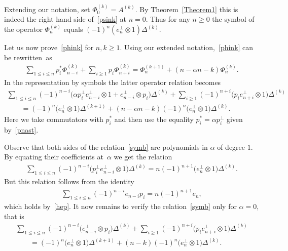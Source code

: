 Extending our notation, set $\Phi^{(k)}_0=A^{(k)}$.
By Theorem~\ref{Theorem1} this is indeed the right hand side of~\eqref{psink} at $n=0$.
Thus for any $n\ge0$ the symbol of the operator $\Phi^{(k)}_n$ equals $(-1)^{
n}(e_n^{\perp}\otimes1)\Delta^{(k)}$.

Let us now prove~\eqref{phink} for $n,k\ge1$.
Using our extended notation,~\eqref{phink} can be rewritten~as
\begin{gather*}
\sum_{1\le i\le n}p^{\ast}_i\Phi_{n-i}^{(k)}+\sum_{i\ge1}
p_i\Phi_{n+i}^{(k)}=\Phi^{(k+1)}_n+(
n-\alpha n-k)\Phi_n^{(k)}.
\end{gather*}
In the representation by symbols the latter operator relation becomes
\begin{gather}
\sum_{1\le i\le n}(-1)^{n-i}\big(\alpha p^{\perp}_i e_{n-i}^{\perp}\otimes1+e_{n-i}^{\perp}\otimes p_i\big)\Delta^{(k)}
+\sum_{i\ge1}(-1)^{n+i}\big(p_ie_{n+i}^{\perp}\otimes1\big)\Delta^{(k)}
\nonumber
\\
\qquad {}
=(-1)^{n}\big(e_n^{\perp}\otimes1\big)\Delta^{(k+1)}+(n-\alpha n-k)(-1)^{n}\big(e_n^{\perp}\otimes1\big)\Delta^{(k)}.
\label{symb}
\end{gather}
Here we take commutators with $p^{\ast}_i$ and then use the equality
$p^{\ast}_i=\alpha p^{\perp}_i$ given by~\eqref{pnast}.

Observe that both sides of the relation~\eqref{symb} are polynomials in $\alpha$ of degree
$1$.
By equating their coef\/f\/icients at~$\alpha$ we get the relation
\begin{gather*}
\sum_{1\le i\le n}(-1)^{n-i}\big(p^{\perp}_i e_{n-i}
^{\perp}\otimes1\big)\Delta^{(k)}=n(-1)^{n+1}
\big(e_n^{\perp}\otimes1\big)\Delta^{(k)}.
\end{gather*}
But this relation follows from the identity
\begin{gather*}
\sum_{1\le i\le n}(-1)^{n-i}e_{n-i}p_i=n(-1)^{n+1}e_n,
\end{gather*}
which holds by~\eqref{hep}.
It now remains to verify the relation~\eqref{symb} only for $\alpha=0$, that is
\begin{gather}
\sum_{1\le i\le n}(-1)^{n-i}\big(e_{n-i}^{\perp}
\otimes p_i\big)\Delta^{(k)}+\sum_{i\ge1}(-1)^{n+i}
\big(p_ie_{n+i}^{\perp}\otimes1\big)\Delta^{(k)}
\nonumber
\\
\qquad{}
=(-1)^{n}\big(e_n^{\perp}\otimes1\big)\Delta^{(k+1)}+(
n-k)(-1)^{n}\big(e_n^{\perp}\otimes1\big)\Delta^{(k)}.
\label{symbzero}
\end{gather}

